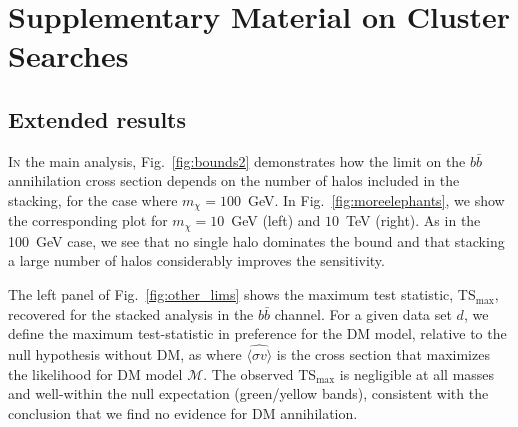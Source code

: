 \chapter{Supplementary Material on Cluster Searches}
\label{supp:clusters}

\section{Extended results}
\label{sec:extended}

\lettrine[lines=3]{I}{n} the main analysis, Fig.~\ref{fig:bounds2}  demonstrates how the limit on the  $b\bar b$ annihilation cross section  depends on the number of halos included in the stacking, for the case where  $m_\chi = 100$~GeV. In Fig.~\ref{fig:moreelephants}, we show the corresponding plot for $m_\chi = 10$~GeV (left) and $10$~TeV (right).  As in the 100~GeV case, we see that no single halo dominates the bound and that stacking a large number of halos considerably improves the sensitivity.

The left panel of Fig.~\ref{fig:other_lims} shows the maximum test statistic, TS$_\text{max}$, recovered for the stacked analysis in the $b\bar{b}$ channel.  For a given data set $d$, we define the maximum test-statistic in preference for the DM model, relative to the null hypothesis without DM, as 
where $\widehat{\langle\sigma v\rangle}$ is the cross section that maximizes the likelihood for DM model $\mathcal{M}$.  The observed TS$_\text{max}$ is negligible at all masses and well-within the null expectation (green/yellow bands), consistent with the conclusion that we find no evidence for DM annihilation.  \vspace{0.1in}

